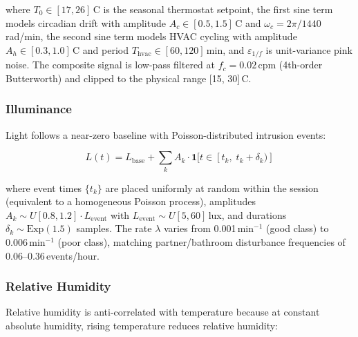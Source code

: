 \documentclass[11pt,a4paper,twocolumn]{article}
\begin{document}

where $T_0 \in [17, 26]$\,\textdegree C is the seasonal thermostat setpoint,
the first sine term models circadian drift with amplitude
$A_c \in [0.5, 1.5]$\,\textdegree C and $\omega_c = 2\pi/1440$\,rad/min,
the second sine term models HVAC cycling with amplitude
$A_h \in [0.3, 1.0]$\,\textdegree C and period $T_\text{hvac} \in [60, 120]$\,min,
and $\varepsilon_{1/f}$ is unit-variance pink noise.
The composite signal is low-pass filtered at $f_c = 0.02$\,cpm
(4th-order Butterworth) and clipped to the physical range [15, 30]\,\textdegree C.

\subsubsection{Illuminance}


Light follows a near-zero baseline with Poisson-distributed intrusion events:

\begin{equation}
  L(t) = L_{\text{base}} + \sum_{k} A_k \cdot
         \mathbf{1}[t \in [t_k,\; t_k + \delta_k)]
\end{equation}

where event times $\{t_k\}$ are placed uniformly at random within the session
(equivalent to a homogeneous Poisson process),
amplitudes $A_k \sim U[0.8, 1.2] \cdot L_{\text{event}}$ with
$L_{\text{event}} \sim U[5, 60]$\,lux,
and durations $\delta_k \sim \text{Exp}(1.5)$ samples.
The rate $\lambda$ varies from 0.001\,min$^{-1}$ (good class) to
0.006\,min$^{-1}$ (poor class), matching partner/bathroom disturbance
frequencies of 0.06--0.36\,events/hour.

\subsubsection{Relative Humidity}

Relative humidity is anti-correlated with temperature because at constant
absolute humidity, rising temperature reduces relative humidity:
\end{document}
